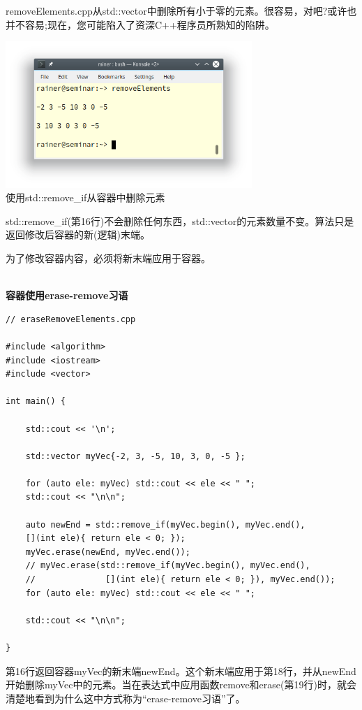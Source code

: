 removeElements.cpp从std::vector中删除所有小于零的元素。很容易，对吧?或许也并不容易;现在，您可能陷入了资深C++程序员所熟知的陷阱。

\begin{center}
\includegraphics[width=0.7\textwidth]{content/3/chapter5/images/11.png}\\
使用std::remove\_if从容器中删除元素
\end{center}

std::remove\_if(第16行)不会删除任何东西，std::vector的元素数量不变。算法只是返回修改后容器的新(逻辑)末端。

为了修改容器内容，必须将新末端应用于容器。

\hspace*{\fill} \\ %
\noindent
\textbf{容器使用erase-remove习语}
\begin{lstlisting}[style=styleCXX]
// eraseRemoveElements.cpp

#include <algorithm>
#include <iostream>
#include <vector>

int main() {
	
	std::cout << '\n';
	
	std::vector myVec{-2, 3, -5, 10, 3, 0, -5 };
	
	for (auto ele: myVec) std::cout << ele << " ";
	std::cout << "\n\n";
	
	auto newEnd = std::remove_if(myVec.begin(), myVec.end(),
	[](int ele){ return ele < 0; });
	myVec.erase(newEnd, myVec.end());
	// myVec.erase(std::remove_if(myVec.begin(), myVec.end(),
	//              [](int ele){ return ele < 0; }), myVec.end());
	for (auto ele: myVec) std::cout << ele << " ";
	
	std::cout << "\n\n";

}
\end{lstlisting}

第16行返回容器myVec的新末端newEnd。这个新末端应用于第18行，并从newEnd开始删除myVec中的元素。当在表达式中应用函数remove和erase(第19行)时，就会清楚地看到为什么这中方式称为“erase-remove习语”了。


